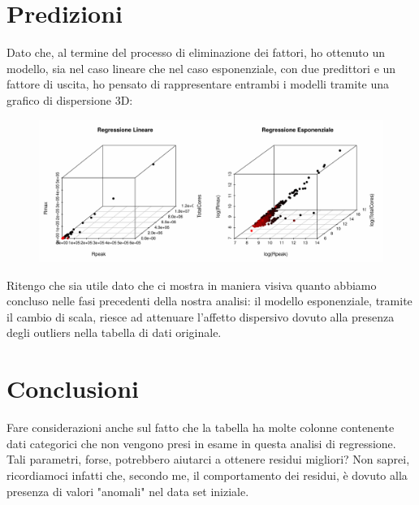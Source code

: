 \documentclass[11pt,a4paper]{article}
\begin{document}
\section{Predizioni}
Dato che, al termine del processo di eliminazione dei fattori, ho ottenuto un
modello, sia nel caso lineare che nel caso esponenziale, con due predittori e un
fattore di uscita, ho pensato di rappresentare entrambi i modelli tramite una
grafico di dispersione 3D:
\vspace{-0.5cm}
\begin{figure}[H]
	\begin{center}
		\hspace*{-2.7cm}
		\includegraphics[scale=0.7]{imgs/scatterplot_3d.pdf}
		\vspace{-1cm}
	\end{center}
\end{figure}
\noindent
Ritengo che sia utile dato che ci mostra in maniera visiva quanto abbiamo
concluso nelle fasi precedenti della nostra analisi: il modello esponenziale,
tramite il cambio di scala, riesce ad attenuare l'affetto dispersivo dovuto
alla presenza degli outliers nella tabella di dati originale.

\section{Conclusioni}
Fare considerazioni anche sul fatto che la tabella ha molte colonne contenente
dati categorici che non vengono presi in esame in questa analisi di regressione.
Tali parametri, forse, potrebbero aiutarci a ottenere residui migliori? Non
saprei, ricordiamoci infatti che, secondo me, il comportamento dei residui, \`e
dovuto alla presenza di valori "anomali" nel data set iniziale.
\end{document}

